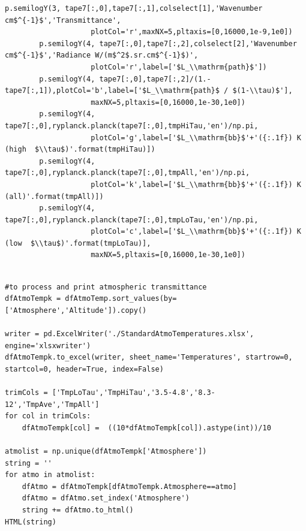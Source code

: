 \documentclass{workpackage}
\begin{document}
\begin{lstlisting}[style=incellstyle,caption={Code Listing in cell 21 \label{lst:autolistingcell21}}]
        p.semilogY(3, tape7[:,0],tape7[:,1],colselect[1],'Wavenumber cm$^{-1}$','Transmittance',
                    plotCol='r',maxNX=5,pltaxis=[0,16000,1e-9,1e0])
        p.semilogY(4, tape7[:,0],tape7[:,2],colselect[2],'Wavenumber cm$^{-1}$','Radiance W/(m$^2$.sr.cm$^{-1}$)',
                    plotCol='r',label=['$L_\\mathrm{path}$'])
        p.semilogY(4, tape7[:,0],tape7[:,2]/(1.-tape7[:,1]),plotCol='b',label=['$L_\\mathrm{path}$ / $(1-\\tau)$'], 
                    maxNX=5,pltaxis=[0,16000,1e-30,1e0])
        p.semilogY(4, tape7[:,0],ryplanck.planck(tape7[:,0],tmpHiTau,'en')/np.pi,
                    plotCol='g',label=['$L_\\mathrm{bb}$'+'({:.1f}) K (high  $\\tau$)'.format(tmpHiTau)])
        p.semilogY(4, tape7[:,0],ryplanck.planck(tape7[:,0],tmpAll,'en')/np.pi,
                    plotCol='k',label=['$L_\\mathrm{bb}$'+'({:.1f}) K (all)'.format(tmpAll)])
        p.semilogY(4, tape7[:,0],ryplanck.planck(tape7[:,0],tmpLoTau,'en')/np.pi,
                    plotCol='c',label=['$L_\\mathrm{bb}$'+'({:.1f}) K (low  $\\tau$)'.format(tmpLoTau)], 
                    maxNX=5,pltaxis=[0,16000,1e-30,1e0])
       
\end{lstlisting}


\begin{lstlisting}[style=incellstyle,caption={Code Listing in cell 22 \label{lst:autolistingcell22}}]
#to process and print atmospheric transmittance
dfAtmoTempk = dfAtmoTemp.sort_values(by=['Atmosphere','Altitude']).copy()

writer = pd.ExcelWriter('./StandardAtmoTemperatures.xlsx', engine='xlsxwriter')
dfAtmoTempk.to_excel(writer, sheet_name='Temperatures', startrow=0, startcol=0, header=True, index=False)

trimCols = ['TmpLoTau','TmpHiTau','3.5-4.8','8.3-12','TmpAve','TmpAll']
for col in trimCols:
    dfAtmoTempk[col] =  ((10*dfAtmoTempk[col]).astype(int))/10

atmolist = np.unique(dfAtmoTempk['Atmosphere'])
string = ''
for atmo in atmolist:
    dfAtmo = dfAtmoTempk[dfAtmoTempk.Atmosphere==atmo]
    dfAtmo = dfAtmo.set_index('Atmosphere')
    string += dfAtmo.to_html()
HTML(string)
\end{lstlisting}
\end{document}

